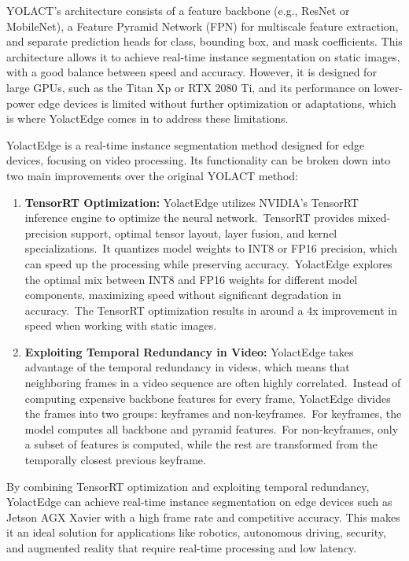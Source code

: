 YOLACT's architecture consists of a feature backbone (e.g., ResNet or MobileNet), a Feature Pyramid Network (FPN) for multiscale feature extraction, and separate prediction heads for class, bounding box, and mask coefficients.
This architecture allows it to achieve real-time instance segmentation on static images, with a good balance between speed and accuracy.
However, it is designed for large GPUs, such as the Titan Xp or RTX 2080 Ti, and its performance on lower-power edge devices is limited without further optimization or adaptations, which is where YolactEdge comes in to address these limitations.

YolactEdge is a real-time instance segmentation method designed for edge devices, focusing on video processing.
Its functionality can be broken down into two main improvements over the original YOLACT method:

\begin{enumerate}
    \item \textbf{TensorRT Optimization:} YolactEdge utilizes NVIDIA's TensorRT inference engine to optimize the neural network.\ TensorRT provides mixed-precision support, optimal tensor layout, layer fusion, and kernel specializations.\ It quantizes model weights to INT8 or FP16 precision, which can speed up the processing while preserving accuracy.\ YolactEdge explores the optimal mix between INT8 and FP16 weights for different model components, maximizing speed without significant degradation in accuracy.\ The TensorRT optimization results in around a 4x improvement in speed when working with static images.
    \item \textbf{Exploiting Temporal Redundancy in Video:} YolactEdge takes advantage of the temporal redundancy in videos, which means that neighboring frames in a video sequence are often highly correlated.\ Instead of computing expensive backbone features for every frame, YolactEdge divides the frames into two groups: keyframes and non-keyframes.\ For keyframes, the model computes all backbone and pyramid features.\ For non-keyframes, only a subset of features is computed, while the rest are transformed from the temporally closest previous keyframe.
\end{enumerate}

By combining TensorRT optimization and exploiting temporal redundancy, YolactEdge can achieve real-time instance segmentation on edge devices such as Jetson AGX Xavier with a high frame rate and competitive accuracy.
This makes it an ideal solution for applications like robotics, autonomous driving, security, and augmented reality that require real-time processing and low latency.

